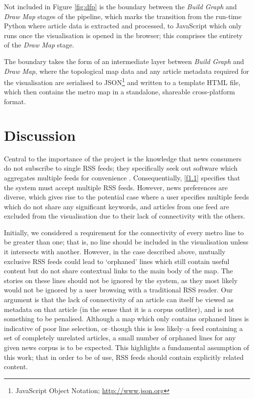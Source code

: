 Not included in Figure \ref{fig:dfp} is the boundary between the \textit{Build Graph} and \textit{Draw Map} stages of the pipeline, which marks the transition from the run-time Python where article data is extracted and processed, to JavaScript which only runs once the visualisation is opened in the browser; this comprises the entirety of the  \textit{Draw Map} stage. 

The boundary takes the form of an intermediate layer between \textit{Build Graph} and \textit{Draw Map}, where the topological map data and any article metadata required for the visualisation are serialised to JSON\footnote{JavaScript Object Notation; \url{http://www.json.org}} and written to a template HTML file, which then contains the metro map in a standalone, shareable cross-platform format.

\section{Discussion}

Central to the importance of the project is the knowledge that news consumers do not subscribe to single RSS feeds; they specifically seek out software which aggregates multiple feeds for convenience \citep{nreader}. Consequentially, \ref{f1.1} specifies that the system must accept multiple RSS feeds. However, news preferences are diverse, which gives rise to the potential case where a user specifies multiple feeds which do not share any significant keywords, and articles from one feed are excluded from the visualisation due to their lack of connectivity with the others. 

Initially, we considered a requirement for the connectivity \citep{GeneratingInformationMaps} of every metro line to be greater than one; that is, no line should be included in the visualisation unless it intersects with another. However, in the case described above, mutually exclusive RSS feeds could lead to `orphaned' lines which still contain useful content but do not share contextual links to the main body of the map. The stories on these lines should not be ignored by the system, as they most likely would not be ignored by a user browsing with a traditional RSS reader. Our argument is that the lack of connectivity of an article can itself be viewed as metadata on that article (in the sense that it is a corpus outliter), and is not something to be penalised. Although a map which only contains orphaned lines is indicative of poor line selection, or--though this is less likely--a feed containing a set of completely unrelated articles, a small number of orphaned lines for any given news corpus is to be expected. This highlights a fundamental assumption of this work; that in order to be of use, RSS feeds should contain explicitly related content.

